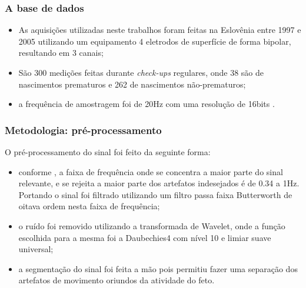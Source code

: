 \documentclass{beamer}
\begin{document}

\begin{frame}
	\frametitle{A base de dados}	
	
	\begin{itemize}
	
		\item As aquisições utilizadas neste trabalhos foram feitas na Eslovênia entre 1997 e 2005 utilizando um equipamento 4 eletrodos de superfície de forma bipolar, resultando em 3 canais;
		
		\item São 300 medições feitas durante {\em check-ups} regulares, onde 38 são de nascimentos prematuros e 262 de nascimentos não-prematuros;
		
		\item a frequência de amostragem foi de 20Hz com uma resolução de 16bits \cite{Kavšek}.
	
	\end{itemize}
	
\end{frame}


\begin{frame}
	\frametitle{Metodologia: pré-processamento}	
	
	O pré-processamento do sinal foi feito da seguinte forma: 
	
	\begin{itemize}
		
		\item conforme \cite{ref-lucovnik}, a faixa de frequência onde se concentra a maior parte do sinal relevante, e se rejeita a maior parte dos artefatos indesejados é de 0.34 a 1Hz. Portando o sinal foi filtrado utilizando um filtro passa faixa Butterworth de oitava ordem nesta faixa de frequência;
		
		\item o ruído foi removido utilizando a transformada de Wavelet, onde a função escolhida para a mesma foi a Daubechies4 com nível 10 e limiar suave universal;
		
		\item a segmentação do sinal foi feita a mão pois permitiu fazer uma separação dos artefatos de movimento oriundos da atividade do feto.
		
	\end{itemize}
	
\end{frame}
\end{document}
